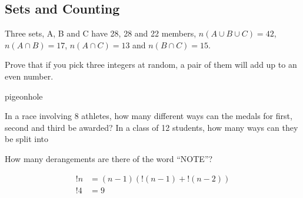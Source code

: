 \begin{questions}
	\subsection{Sets and Counting}
	\question Three sets, A, B and C have 28, 28 and 22 members, $n(A\cup B \cup C) = 42$, $n(A \cap B) = 17$, $n(A \cap C) = 13$ and $n(B \cap C) = 15$. 
	\question Prove that if you pick three integers at random, a pair of them will add up to an even number. \begin{solution}pigeonhole\end{solution}
	\question In a race involving 8 athletes, how many different ways can the medals for first, second and third be awarded? 
	\question In a class of 12 students, how many ways can they be split into 

	\question How many derangements are there of the word ``NOTE''? 
	\begin{solution}
	\begin{align}
	!n &= (n-1)(!(n-1)+!(n-2)) \\
	!4 &= 9
	\end{align}
	\end{solution}

\end{questions}
